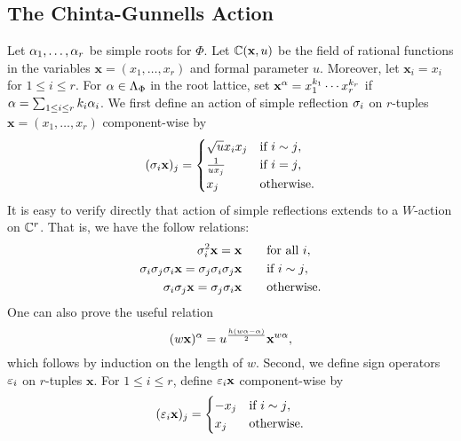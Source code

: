     \subsection*{The Chinta-Gunnells Action}
        Let $\alpha_{1},\ldots,\alpha_{r}$ be simple roots for $\Phi$. Let $\mathbb{C}(\mathbf{x},u)$ be the field of rational functions in the variables $\mathbf{x} = (x_{1},\ldots,x_{r})$ and formal parameter $u$. Moreover, let $\mathbf{x}_{i} = x_{i}$ for $1 \le i \le r$. For $\alpha \in \Lambda_{\Phi}$ in the root lattice, set $\mathbf{x}^{\alpha} = x_{1}^{k_{1}} \cdots x_{r}^{k_{r}}$ if $\alpha = \sum_{1 \le i \le r}k_{i}\alpha_{i}$. We first define an action of simple reflection $\sigma_{i}$ on $r$-tuples $\mathbf{x} = (x_{1},\ldots,x_{r})$ component-wise by
        \[
            (\sigma_{i}\mathbf{x})_{j} = \begin{cases} \sqrt{u}x_{i}x_{j} & \text{if $i \sim j$}, \\ \frac{1}{ux_{j}} & \text{if $i = j$}, \\ x_{j} & \text{otherwise}. \end{cases}
        \]
        It is easy to verify directly that action of simple reflections extends to a $W$-action on $\mathbb{C}^{r}$. That is, we have the follow relations:
        \begin{equation}\label{equ:relations_for_action_of_simple_reflections_on_tuples}
            \begin{aligned}
                \sigma_{i}^{2}\mathbf{x} = \mathbf{x} \qquad &\text{for all $i$}, \\
                \sigma_{i}\sigma_{j}\sigma_{i}\mathbf{x} = \sigma_{j}\sigma_{i}\sigma_{j}\mathbf{x} \qquad &\text{if $i \sim j$}, \\
                \sigma_{i}\sigma_{j}\mathbf{x} = \sigma_{j}\sigma_{i}\mathbf{x} \qquad &\text{otherwise}.
            \end{aligned}
        \end{equation}
        One can also prove the useful relation
        \begin{equation}\label{equ:useful_relation}
            (w\mathbf{x})^{\alpha} = u^{\frac{h(w\alpha-\alpha)}{2}}\mathbf{x}^{w\alpha},
        \end{equation}
        which follows by induction on the length of $w$. Second, we define sign operators $\varepsilon_{i}$ on $r$-tuples $\mathbf{x}$. For $1 \le i \le r$, define $\varepsilon_{i}\mathbf{x}$ component-wise by
        \[
            (\varepsilon_{i}\mathbf{x})_{j} = \begin{cases} -x_{j} & \text{if $i \sim j$}, \\ x_{j} & \text{otherwise}. \end{cases}
        \]
